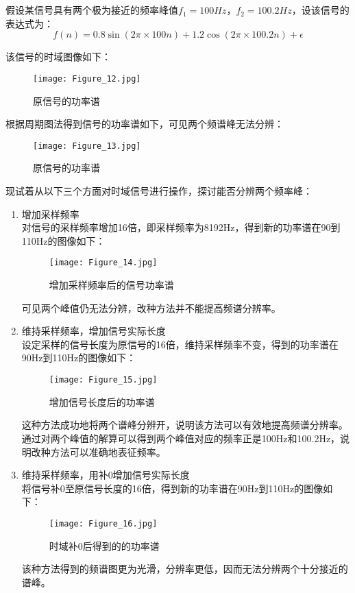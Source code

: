 \documentclass[12pt]{ctexart}
\begin{document}
    \section{}
    假设某信号具有两个极为接近的频率峰值$f_1=100Hz$，$f_2=100.2Hz$，设该信号的表达式为：
    \begin{equation*}
        f(n)=0.8\sin(2\pi\times 100n)+1.2\cos(2\pi\times 100.2n)+\epsilon
    \end{equation*} \par
    该信号的时域图像如下：
    \begin{figure}[H]
        \centering
        \texttt{[image: Figure\_12.jpg]}
        \caption{原信号的功率谱}
    \end{figure} \par
    根据周期图法得到信号的功率谱如下，可见两个频谱峰无法分辨：
    \begin{figure}[H]
        \centering
        \texttt{[image: Figure\_13.jpg]}
        \caption{原信号的功率谱}
    \end{figure} \par
    现试着从以下三个方面对时域信号进行操作，探讨能否分辨两个频率峰：\par
    \begin{enumerate}
        \item 增加采样频率 \\
        对信号的采样频率增加16倍，即采样频率为8192Hz，得到新的功率谱在90到110Hz的图像如下：
        \begin{figure}[H]
            \centering
            \texttt{[image: Figure\_14.jpg]}
            \caption{增加采样频率后的信号功率谱}
        \end{figure} \par
        可见两个峰值仍无法分辨，改种方法并不能提高频谱分辨率。
        \item 维持采样频率，增加信号实际长度 \\
        设定采样的信号长度为原信号的16倍，维持采样频率不变，得到的功率谱在90Hz到110Hz的图像如下：
        \begin{figure}[H]
            \centering
            \texttt{[image: Figure\_15.jpg]}
            \caption{增加信号长度后的功率谱}
        \end{figure} \par
        这种方法成功地将两个谱峰分辨开，说明该方法可以有效地提高频谱分辨率。通过对两个峰值的解算可以得到两个峰值对应的频率正是100Hz和100.2Hz，说明改种方法可以准确地表征频率。
        \item 维持采样频率，用补0增加信号实际长度 \\
        将信号补0至原信号长度的16倍，得到新的功率谱在90Hz到110Hz的图像如下：
        \begin{figure}[H]
            \centering
            \texttt{[image: Figure\_16.jpg]}
            \caption{时域补0后得到的的功率谱}
        \end{figure} \par
        该种方法得到的频谱图更为光滑，分辨率更低，因而无法分辨两个十分接近的谱峰。
    \end{enumerate}
\end{document}
